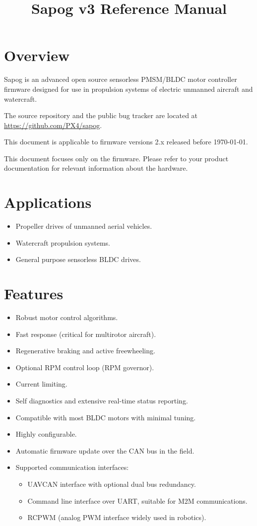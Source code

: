 \documentclass{zubaxdoc}
\title{Sapog v3 Reference Manual}
\begin{document}
\frontmatter

\begin{titlepage}
	\section*{Overview}\label{sec:overview}
	
	Sapog is an advanced open source sensorless PMSM/\allowbreak{}BLDC motor controller firmware designed for
	use in propulsion systems of electric unmanned aircraft and watercraft.
	
	The source repository and the public bug tracker are located at
	\url{https://github.com/PX4/sapog}.
	
	This document is applicable to firmware versions 2.x released before \today.
	
	This document focuses only on the firmware.
	Please refer to your product documentation for relevant information about the hardware.
	
	\section*{Applications}
	\begin{itemize}
		\item Propeller drives of unmanned aerial vehicles.
		\item Watercraft propulsion systems.
		\item General purpose sensorless BLDC drives.
	\end{itemize}
	
	\BeginRightColumn
	\section*{Features}
	\begin{itemize}
		\item Robust motor control algorithms.
		\item Fast response (critical for multirotor aircraft).
		\item Regenerative braking and active freewheeling.
		\item Optional RPM control loop (RPM governor).
		\item Current limiting.
		\item Self diagnostics and extensive real-time status reporting.
		\item Compatible with most BLDC motors with minimal tuning.
		\item Highly configurable.
		\item Automatic firmware update over the CAN bus in the field.
		\item Supported communication interfaces:
		\begin{itemize}
			\item UAVCAN interface with optional dual bus redundancy.
			\item Command line interface over UART, suitable for M2M communications.
			\item RCPWM (analog PWM interface widely used in robotics).
		\end{itemize}
	\end{itemize}
\end{titlepage}
\end{document}
